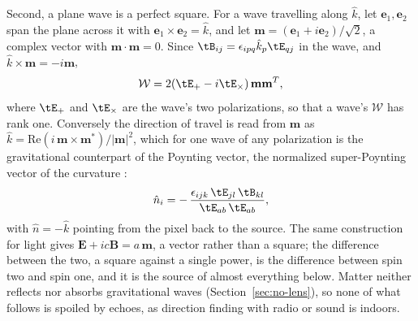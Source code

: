 Second, a plane wave is a perfect square. For a wave travelling along $\hat k$,
let $\mathbf{e}_1, \mathbf{e}_2$ span the plane across it with
$\mathbf{e}_1\times\mathbf{e}_2 = \hat k$, and let
$\mathbf{m} = (\mathbf{e}_1 + i\mathbf{e}_2)/\sqrt2$, a complex vector with
$\mathbf{m}\cdot\mathbf{m} = 0$. Since $\tB_{ij} = \epsilon_{ipq}\hat k_p\tE_{qj}$ in
the wave, and $\hat k\times\mathbf{m} = -i\mathbf{m}$,
\begin{equation}\label{eq:square}
\mathcal{W} = 2(\tE_+ - i\tE_\times)\,\mathbf{m}\mathbf{m}^{T},
\end{equation}
where $\tE_+$ and $\tE_\times$ are the wave's two polarizations, so that a wave's
$\mathcal{W}$ has rank one. Conversely the direction of travel is read from $\mathbf{m}$
as $\hat k = \mathrm{Re}(i\,\mathbf{m}\times\mathbf{m}^*)/|\mathbf{m}|^2$, which for
one wave of any polarization is the gravitational counterpart of the Poynting
vector, the normalized super-Poynting vector of the curvature
\cite{MaartensBassett1998}:
\begin{equation}\label{eq:one-wave}
\hat n_i = -\,\frac{\epsilon_{ijk}\,\tE_{jl}\,\tB_{kl}}{\tE_{ab}\,\tE_{ab}} ,
\end{equation}
with $\hat n = -\hat k$ pointing from the pixel back to the source. The same
construction for light gives $\mathbf{E} + ic\mathbf{B} = a\,\mathbf{m}$, a vector
rather than a square; the difference between the two, a square against a single
power, is the difference between spin two and spin one, and it is the source of
almost everything below. Matter neither reflects nor absorbs gravitational waves
(Section~\ref{sec:no-lens}), so none of what follows is spoiled by echoes, as
direction finding with radio or sound is indoors.

